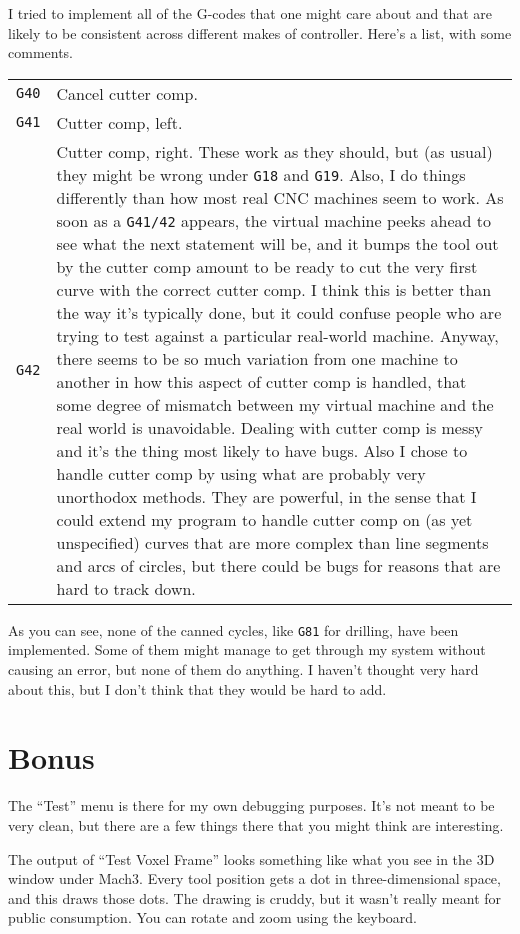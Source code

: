 \documentclass[titlepage,oneside,10pt]{article}
\begin{document}
I tried to implement all of the G-codes that one might care about and
that are likely to be consistent across different makes of
controller. Here's a list, with some comments.
\vskip 0.25cm
\begin{longtable}{lp{10cm}}
{\tt G40}&Cancel cutter comp.\\
{\tt G41}&Cutter comp, left.\\
{\tt G42}&Cutter comp, right. These work as they should, but (as
usual) they might be wrong under {\tt G18} and {\tt G19}. Also, I do
things differently than how most real CNC machines seem to
work. As soon as a {\tt G41/42} appears, the virtual machine peeks
ahead to see what the next statement will be, and it bumps the tool
out by the cutter comp amount to be ready to cut the very first curve
with the correct cutter comp. I think this is better than the way
it's typically done, but it could confuse people who are trying to
test against a particular real-world machine. Anyway, there seems to
be so much variation 
from one machine to another in how this aspect of cutter comp is
handled, that some degree of mismatch between my virtual machine and
the real world is unavoidable. 
\vskip 0.10cm
Dealing with cutter comp is messy and it's the thing most likely to
have bugs. Also I chose to handle cutter comp by using what are
probably very unorthodox methods. They are powerful, in the sense that
I could extend my program to handle cutter comp on (as yet
unspecified) curves that are more complex than line segments and arcs
of circles, but there could be bugs for reasons
that are hard to track down.\\
\end{longtable}
\vskip 0.50cm
As you can see, none of the canned cycles, like {\tt G81} for
drilling, have been implemented. Some of them might manage to get
through my system without causing an error, but none of them do
anything. I haven't thought very hard about this, but I don't think that
they would be hard to add.

\section{Bonus}

The ``Test'' menu is there for my own debugging purposes. It's not
meant to be very clean, but there are a few things there that you
might think are interesting.

The output of ``Test Voxel Frame'' looks something like what you see
in the 3D window under Mach3. Every tool position gets a dot in
three-dimensional space, and this draws those dots. The drawing is
cruddy, but it wasn't really meant for public consumption. You can
rotate and zoom using the keyboard. 
\end{document}
